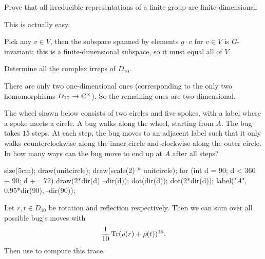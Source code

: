 \begin{problem}
	Prove that all irreducible representations
	of a finite group are finite-dimensional.
	\begin{hint}
		This is actually easy.
	\end{hint}
	\begin{sol}
		Pick any $v \in V$, then the subspace
		spanned by elements $g \cdot v$ for $v \in V$
		is $G$-invariant;
		this is a finite-dimensional subspace,
		so it must equal all of $V$.
	\end{sol}
\end{problem}

\begin{problem}
	\label{prob:dten_irrep}
	Determine all the complex irreps of $D_{10}$.
	\begin{hint}
		There are only two one-dimensional ones
		(corresponding to the only two homomorphisms $D_{10} \to \mathbb C^\times$).
		So the remaining ones are two-dimensional.
	\end{hint}
\end{problem}

\begin{problem}
	[AIME 2018]
	\onechili
	The wheel shown below consists of two circles and five spokes, with a label
	where a spoke meets a circle. A bug walks along the wheel, starting from $A$.
	The bug takes $15$ steps. At each step, the bug moves to an adjacent label such
	that it only walks counterclockwise along the inner circle and clockwise along the
	outer circle. In how many ways can the bug move to end up at $A$ after all steps?
	\begin{center}
		\begin{asy}
		size(5cm);
		draw(unitcircle);
		draw(scale(2) * unitcircle);
		for (int d = 90; d < 360 + 90; d += 72) {
			draw(2*dir(d) --dir(d));
			dot(dir(d));
			dot(2*dir(d));
		}
		label("$A$", 0.95*dir(90), -dir(90));
		\end{asy}
	\end{center}
	\begin{hint}
		Let $r, t \in D_{10}$ be rotation and reflection respectively. Then we can sum over all possible bug's moves with
		\[ \frac{1}{10} \operatorname{Tr} (\rho(r) + \rho(t))^{15}. \]
		Then use  to compute this trace.
	\end{hint}
\end{problem}
